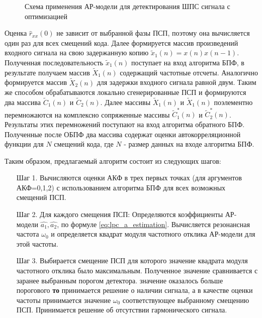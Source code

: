 \begin{figure}[h]
	\center{}
	\caption{Схема применения АР-модели для детектирования ШПС сигнала с оптимизацией}
	\label{pic:lpc_basic2}
\end{figure}

Оценка ${\hat{r}_{xx}(0)}$ не зависит от выбранной фазы ПСП, поэтому она вычисляется один
раз для всех смещений кода. Далее формируется массив произведений входного сигнала на
свою задержанную копию ${\tilde{x}_1(n)=x(n)x(n-1)}$. Полученная последовательность  
${\tilde{x}_1(n)}$ поступает на вход алгоритма БПФ, в результате получаем массив ${\tilde{X}_1(n)}$
содержащий частотные отсчеты. Аналогично формируется массив  ${\tilde{X}_2(n)}$ для
задержки входного сигнала равной двум. Таким же способом обрабатываются локально
сгенерированные ПСП и формируются два массива ${\tilde{C}_1(n)}$ и ${\tilde{C}_2(n)}$.
Далее массивы ${\tilde{X}_1(n)}$ и ${\tilde{X}_1(n)}$ поэлементно перемножаются
на комплексно сопряженные массивы ${\tilde{C}_1^*(n)}$ и ${\tilde{C}_2^*(n)}$.
Результаты этих перемножений поступают на вход алгоритма обратного
БПФ. Полученные после ОБПФ два массива содержат оценки автокорреляционной функции для ${N}$ 
смещений кода, где  ${N}$ - размер данных на входе алгоритма БПФ.

Таким образом, предлагаемый алгоритм состоит из следующих шагов:

\begin{itemize}[align=left,style=nextline,leftmargin=*,labelsep=\parindent,font=\normalfont]
\item[Шаг 1.] Вычисляются оценки  АКФ в трех первых точках (для аргументов АКФ=0,1,2)
	с использованием алгоритма БПФ для всех возможных смещений ПСП. 
\item[Шаг 2.] Для каждого смещения ПСП: 
	Определяются коэффициенты АР-модели ${\hat{a_1}, \hat{a_2}}$, 
	по формуле \ref{eq:lpc_a_estimation}. 
	Вычисляется резонансная частота ${\omega_0}$
	и определяется квадрат модуля частотного отклика АР-модели для этой частоты. 
\item[Шаг 3.] Выбирается смещение ПСП для которого значение квадрата модуля частотного отклика было максимальным. Полученное значение сравнивается с заранее выбранным порогом детектора. 
	  значение оказалось больше порогового {\bf{то}} 
		принимается решение о наличии сигнала, а в качестве оценки
		частоты принимается значение ${\omega_0}$ соответствующее выбранному смещению ПСП. 
		Принимается решение об отсутствии гармонического сигнала.
\end{itemize}


